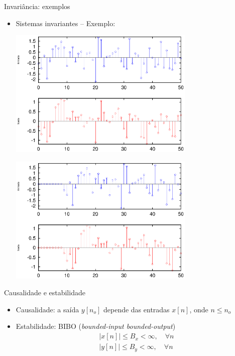\documentclass[
size=17pt,
paper=smartboard,
mode=present,
display=slidesnotes,
style=sailor,
nopagebreaks,
blackslide,
fleqn]{powerdot}
\begin{document}
\begin{slide}{Invariância: exemplos}
   \begin{itemize}
   \item Sistemas invariantes -- Exemplo:
    {
   \begin{center}
     \includegraphics[width=0.7\textwidth]{figs/invariante01.eps}
    \end{center}}
    {
   \begin{center}
     \includegraphics[width=0.7\textwidth]{figs/invariante02.eps}
    \end{center}}
   \end{itemize}
\end{slide} 

\begin{slide}{Causalidade e estabilidade}
   \begin{itemize}
    \item <1->Causalidade: a saída $y[n_o]$ depende das entradas $x[n]$, onde $n \leq n_o$
    \item <2>Estabilidade: BIBO (\textit{bounded-input bounded-output})\\
    \begin{align*}
       |x[n]| \leq B_x < \infty, \quad \forall n\\
       |y[n]| \leq B_y < \infty, \quad \forall n
    \end{align*}

  \end{itemize}
\end{slide}
\end{document}
